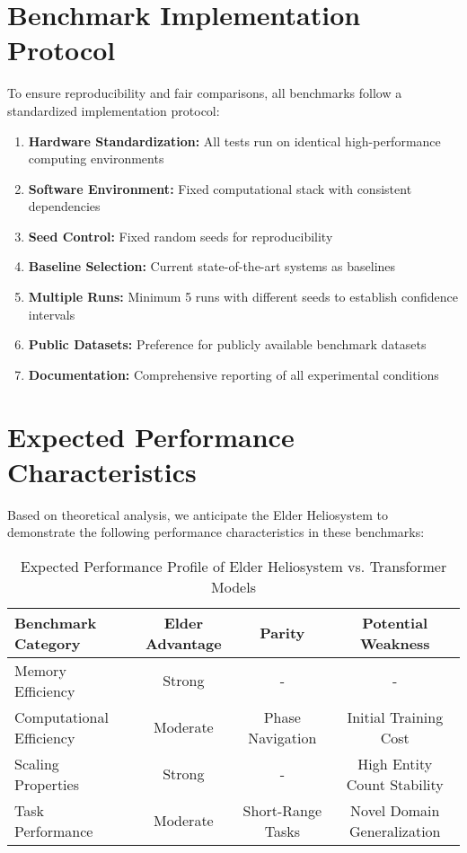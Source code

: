 \section{Benchmark Implementation Protocol}

To ensure reproducibility and fair comparisons, all benchmarks follow a standardized implementation protocol:

\begin{enumerate}
    \item \textbf{Hardware Standardization:} All tests run on identical high-performance computing environments
    \item \textbf{Software Environment:} Fixed computational stack with consistent dependencies
    \item \textbf{Seed Control:} Fixed random seeds for reproducibility
    \item \textbf{Baseline Selection:} Current state-of-the-art systems as baselines
    \item \textbf{Multiple Runs:} Minimum 5 runs with different seeds to establish confidence intervals
    \item \textbf{Public Datasets:} Preference for publicly available benchmark datasets
    \item \textbf{Documentation:} Comprehensive reporting of all experimental conditions
\end{enumerate}

\section{Expected Performance Characteristics}

Based on theoretical analysis, we anticipate the Elder Heliosystem to demonstrate the following performance characteristics in these benchmarks:

\begin{table}[h]
\centering
\begin{tabular}{|l|c|c|c|}
\hline
\textbf{Benchmark Category} & \textbf{Elder Advantage} & \textbf{Parity} & \textbf{Potential Weakness} \\
\hline
Memory Efficiency & Strong & - & - \\
\hline
Computational Efficiency & Moderate & Phase Navigation & Initial Training Cost \\
\hline
Scaling Properties & Strong & - & High Entity Count Stability \\
\hline
Task Performance & Moderate & Short-Range Tasks & Novel Domain Generalization \\
\hline
\end{tabular}
\caption{Expected Performance Profile of Elder Heliosystem vs. Transformer Models}
\end{table}

